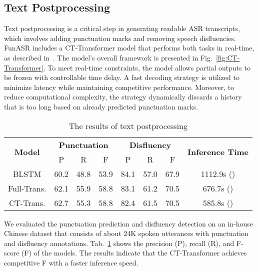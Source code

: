 \documentclass{INTERSPEECH2023}
\begin{document}
\subsection{Text Postprocessing}
Text postprocessing is a critical step in generating readable ASR transcripts, which involves adding punctuation marks and removing speech disfluencies. FunASR includes a CT-Transformer model that performs both tasks in real-time, as described in~\cite{chen2020controllable}. The model's overall framework is presented in Fig.~\ref{fig:CT-Transformer}. To meet real-time constraints, the model allows partial outputs to be frozen with controllable time delay. A fast decoding strategy is utilized to minimize latency while maintaining competitive performance. Moreover, to reduce computational complexity, the strategy dynamically discards a history that is too long based on already predicted punctuation marks.


\begin{table}[h]
\vspace{-1mm}
\caption{The results of text postprocessing}
\vspace{-5mm}
\begin{center}
\scalebox{0.78}
{
\begin{tabular}{c c c c c c c c}
\hline
\multirow{2}{*}{\textbf{Model}} & 
\multicolumn{3}{c}{\textbf{Punctuation}} & 
\multicolumn{3}{c}{\textbf{Disfluency}} &
\multirow{2}{*}{\textbf{Inference Time}}\\
& P & R & F & P & R & F \\
\hline
BLSTM  & 60.2 & 48.8 & 53.9  & 84.1 & 57.0 & 67.9 & 1112.9s ()\\
Full-Trans. & 62.1 & 55.9 & 58.8 & 83.1 & 61.2 & 70.5 & 676.7s ()\\
CT-Trans. & 62.7 & 55.3 & 58.8 & 82.4 & 61.5 & 70.5 & 585.8s ()\\
\hline
\end{tabular}
}
\end{center}
\label{tab:punc_disf_res}
\vspace{-6mm}
\end{table}

We evaluated the punctuation prediction and disfluency detection on an in-house Chinese dataset that consists of about 24K spoken utterances with punctuation and disfluency annotations. Tab.~\ref{tab:punc_disf_res} shows the precision (P), recall (R), and F-score (F) of the models. The results indicate that the CT-Transformer achieves competitive F with a faster inference speed.
\end{document}
